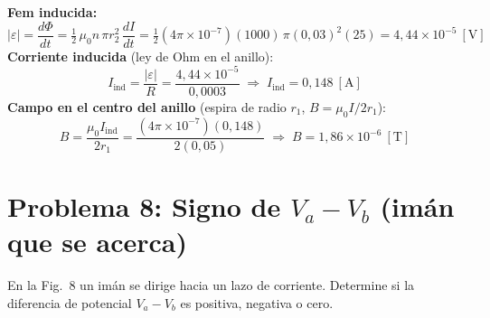 \documentclass[12pt,letterpaper]{article}
\newcommand{\eps}{\varepsilon}
\begin{document}
\medskip

\noindent\textbf{Fem inducida:}
\[
    |\eps| = \frac{d\Phi}{dt} = \tfrac{1}{2}\,\mu_0 n\,\pi r_2^2\,\frac{dI}{dt}
    = \tfrac{1}{2}(4\pi\times10^{-7})(1000)\,\pi(0{,}03)^2(25) = 4{,}44\times10^{-5}\ [\text{V}]
\]
\textbf{Corriente inducida} (ley de Ohm en el anillo):
\[
    I_{\text{ind}} = \frac{|\eps|}{R} = \frac{4{,}44\times10^{-5}}{0{,}0003}
    \;\Rightarrow\; \boxed{I_{\text{ind}} = 0{,}148\ [\text{A}]}
\]
\textbf{Campo en el centro del anillo} (espira de radio $r_1$, $B=\mu_0 I/2r_1$):
\[
    B = \frac{\mu_0 I_{\text{ind}}}{2 r_1} = \frac{(4\pi\times10^{-7})(0{,}148)}{2(0{,}05)}
    \;\Rightarrow\; \boxed{B = 1{,}86\times10^{-6}\ [\text{T}]}
\]

\newpage

\section*{Problema 8: Signo de $V_a - V_b$ (im\'an que se acerca)}

\noindent En la Fig.\ 8 un im\'an se dirige hacia un lazo de corriente. Determine si la diferencia
de potencial $V_a - V_b$ es positiva, negativa o cero.

\medskip
\end{document}
